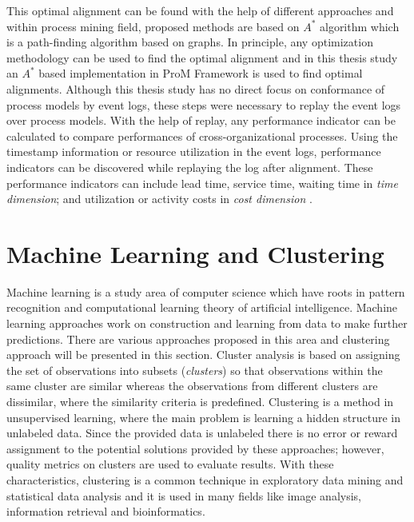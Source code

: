 This optimal alignment can be found with the help of different approaches and within process mining field, proposed methods \cite{adriansyah2011conformance} \cite{adriansyah2011towards} are based on $A^{*}$ algorithm which is a path-finding algorithm based on graphs. In principle, any optimization methodology can be used to find the optimal alignment and in this thesis study an $A^{*}$ based implementation in ProM Framework \cite{verbeek2010prom} is used to find optimal alignments. Although this thesis study has no direct focus on conformance of process models by event logs, these steps were necessary to replay the event logs over process models. With the help of replay, any performance indicator can be calculated to compare performances of cross-organizational processes. Using the timestamp information or resource utilization in the event logs, performance indicators can be discovered while replaying the log after alignment. These performance indicators can include lead time, service time, waiting time in \textit{time dimension}; and utilization or activity costs in \textit{cost dimension} \cite{van2011process}.

\section{Machine Learning and Clustering}
\label{sec:unsupervised-learning}
Machine learning is a study area of computer science which have roots in pattern recognition and computational learning theory of artificial intelligence. Machine learning approaches work on construction and learning from data to make further predictions. There are various approaches proposed in this area and clustering approach will be presented in this section. Cluster analysis is based on assigning the set of observations into subsets (\textit{clusters}) so that observations within the same cluster are similar whereas the observations from different clusters are dissimilar, where the similarity criteria is predefined. Clustering is a method in unsupervised learning, where the main problem is learning a hidden structure in unlabeled data. Since the provided data is unlabeled there is no error or reward assignment to the potential solutions provided by these approaches; however, quality metrics on clusters are used to evaluate results. With these characteristics, clustering is a common technique in exploratory data mining and statistical data analysis and it is used in many fields like image analysis, information retrieval and bioinformatics.

